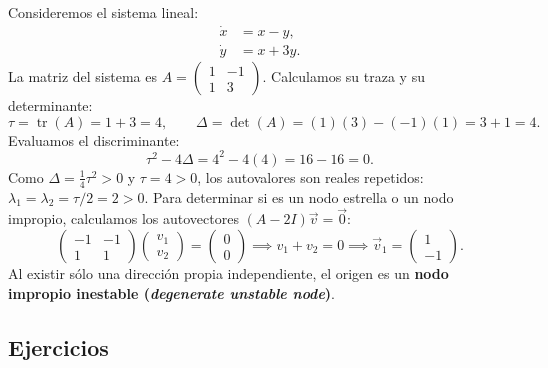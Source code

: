\begin{example}
Consideremos el sistema lineal:
\begin{equation}
\begin{aligned}
    \dot{x} &= x - y, \\
    \dot{y} &= x + 3y.
\end{aligned}
\end{equation}
La matriz del sistema es $A = \begin{pmatrix} 1 & -1 \\ 1 & 3 \end{pmatrix}$. Calculamos su traza y su determinante:
\begin{equation}
    \tau = \operatorname{tr}(A) = 1 + 3 = 4, \qquad \Delta = \det(A) = (1)(3) - (-1)(1) = 3 + 1 = 4.
\end{equation}
Evaluamos el discriminante:
\begin{equation}
    \tau^2 - 4\Delta = 4^2 - 4(4) = 16 - 16 = 0.
\end{equation}
Como $\Delta = \frac{1}{4}\tau^2 > 0$ y $\tau = 4 > 0$, los autovalores son reales repetidos: $\lambda_1 = \lambda_2 = \tau/2 = 2 > 0$. Para determinar si es un nodo estrella o un nodo impropio, calculamos los autovectores $(A - 2I)\vec{v} = \vec{0}$:
\begin{equation}
    \begin{pmatrix} -1 & -1 \\ 1 & 1 \end{pmatrix} \begin{pmatrix} v_1 \\ v_2 \end{pmatrix} = \begin{pmatrix} 0 \\ 0 \end{pmatrix} \implies v_1 + v_2 = 0 \implies \vec{v}_1 = \begin{pmatrix} 1 \\ -1 \end{pmatrix}.
\end{equation}
Al existir sólo una dirección propia independiente, el origen es un \textbf{nodo impropio inestable (\emph{degenerate unstable node})}.
\end{example}

\subsection{Ejercicios}

